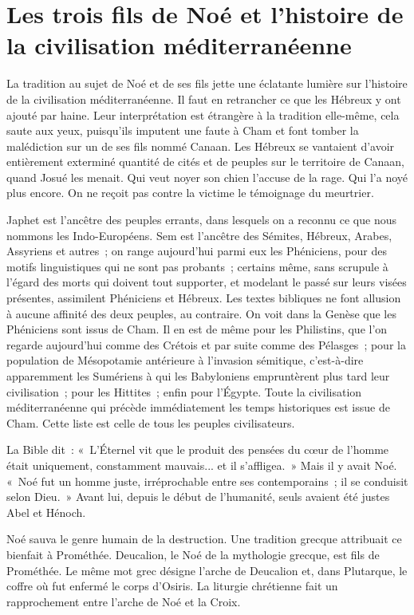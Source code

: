 \documentclass[french,twoside]{book} %
\newcommand\chapteropen{} %
\newcommand\chaptercont{} %
\begin{document}
\chapteropen
\chapter[Les trois fils de Noé et l'histoire de la civilisation méditerranéenne]{Les trois fils de Noé et l'histoire de la civilisation méditerranéenne}

\chaptercont
\noindent La tradition au sujet de Noé et de ses fils jette une éclatante lumière sur l'histoire de la civilisation méditerranéenne. Il faut en retrancher ce que les Hébreux y ont ajouté par haine. Leur interprétation est étrangère à la tradition elle-même, cela saute aux yeux, puisqu'ils imputent une faute à Cham et font tomber la malédiction sur un de ses fils nommé Canaan. Les Hébreux se vantaient d'avoir entièrement exterminé quantité de cités et de peuples sur le territoire de Canaan, quand Josué les menait. Qui veut noyer son chien l'accuse de la rage. Qui l'a noyé plus encore. On ne reçoit pas contre la victime le témoignage du meurtrier.\par
Japhet est l'ancêtre des peuples errants, dans lesquels on a reconnu ce que nous nommons les Indo-Européens. Sem est l'ancêtre des Sémites, Hébreux, Arabes, Assyriens et autres ; on range aujourd'hui parmi eux les Phéniciens, pour des motifs linguistiques qui ne sont pas probants ; certains même, sans scrupule à l'égard des morts qui doivent tout supporter, et modelant le passé sur leurs visées présentes, assimilent Phéniciens et Hébreux. Les textes bibliques ne font allusion à aucune affinité des deux peuples, au contraire. On voit dans la Genèse que les Phéniciens sont issus de Cham. Il en est de même pour les Philistins, que l'on regarde aujourd'hui comme des Crétois et par suite comme des Pélasges ; pour la population de Mésopotamie antérieure à l'invasion sémitique, c'est-à-dire apparemment les Sumériens à qui les Babyloniens empruntèrent plus tard leur civilisation ; pour les Hittites ; enfin pour l'Égypte. Toute la civilisation méditerranéenne qui précède immédiatement les temps historiques est issue de Cham. Cette liste est celle de tous les peuples civilisateurs.\par
La Bible dit : « L'Éternel vit que le produit des pensées du cœur de l'homme était uniquement, constamment mauvais... et il s'affligea. » Mais il y avait Noé. « Noé fut un homme juste, irréprochable entre ses contemporains ; il se conduisit selon Dieu. » Avant lui, depuis le début de l'humanité, seuls avaient été justes Abel et Hénoch.\par
Noé sauva le genre humain de la destruction. Une tradition grecque attribuait ce bienfait à Prométhée. Deucalion, le Noé de la mythologie grecque, est fils de Prométhée. Le même mot grec désigne l'arche de Deucalion et, dans Plutarque, le coffre où fut enfermé le corps d'Osiris. La liturgie chrétienne fait un rapprochement entre l'arche de Noé et la Croix.\par
\end{document}
